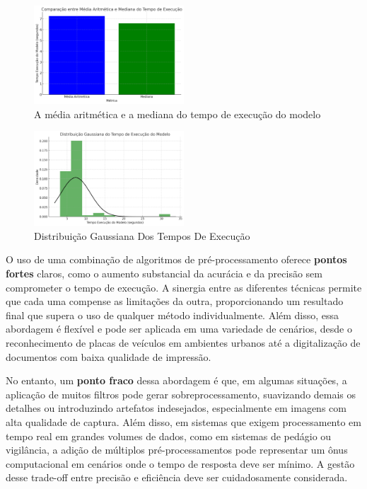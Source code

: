 \documentclass[conference]{IEEEtran}
\begin{document}
\begin{figure}[htbp]
    \centerline{\includegraphics[width=0.5\textwidth]{img17.png}}
    \caption{A média aritmética e a mediana do tempo de execução do modelo}
    \label{img17}
\end{figure}

\begin{figure}[htbp]
    \centerline{\includegraphics[width=0.5\textwidth]{img18.png}}
    \caption{Distribuição Gaussiana Dos Tempos De Execução}
    \label{img18}
\end{figure}

O uso de uma combinação de algoritmos de pré-processamento oferece \textbf{pontos fortes} claros, como o aumento substancial da acurácia e da precisão sem comprometer o tempo de execução. A sinergia entre as diferentes técnicas permite que cada uma compense as limitações da outra, proporcionando um resultado final que supera o uso de qualquer método individualmente. Além disso, essa abordagem é flexível e pode ser aplicada em uma variedade de cenários, desde o reconhecimento de placas de veículos em ambientes urbanos até a digitalização de documentos com baixa qualidade de impressão.

No entanto, um \textbf{ponto fraco} dessa abordagem é que, em algumas situações, a aplicação de muitos filtros pode gerar sobreprocessamento, suavizando demais os detalhes ou introduzindo artefatos indesejados, especialmente em imagens com alta qualidade de captura. Além disso, em sistemas que exigem processamento em tempo real em grandes volumes de dados, como em sistemas de pedágio ou vigilância, a adição de múltiplos pré-processamentos pode representar um ônus computacional em cenários onde o tempo de resposta deve ser mínimo. A gestão desse trade-off entre precisão e eficiência deve ser cuidadosamente considerada.
\end{document}
